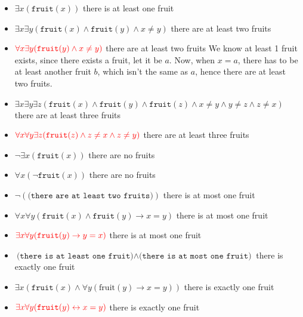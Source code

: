 \documentclass[a4paper, 12pt]{article}
\begin{document}
                \begin{itemize}
                    \itemsep0em
                    \item $\exists x (\texttt{fruit}(x))$ \hfill there is at least one fruit
                    \item $\exists x \exists y (\texttt{fruit}(x) \land \texttt{fruit}(y) \land x \neq y)$ \hfill there are at least two fruits
                    \item $\textcolor{red}{\forall x \exists y (\texttt{fruit}(y) \land x \neq y)}$ \hfill there are at least two fruits
                        \subitem We know at least 1 fruit exists, since there exists a fruit, let it be $a$. Now, when $x = a$, there has to be at least another fruit $b$, which isn't the same as $a$, hence there are at least two fruits.
                    \item $\exists x \exists y \exists z (\texttt{fruit}(x) \land \texttt{fruit}(y) \land \texttt{fruit}(z) \land x \neq y \land y \neq z \land z \neq x)$ \hfill there are at least three fruits
                    \item $\textcolor{red}{\forall x \forall y \exists z (\texttt{fruit}(z) \land z \neq x \land z \neq y)}$ \hfill there are at least three fruits
                    \item $\neg \exists x (\texttt{fruit}(x))$ \hfill there are no fruits
                    \item $\forall x (\neg \texttt{fruit}(x))$ \hfill there are no fruits
                    \item $\neg(\texttt{(there are at least two fruits)})$ \hfill there is at most one fruit
                    \item $\forall x \forall y (\texttt{fruit}(x) \land \texttt{fruit}(y) \rightarrow x = y)$ \hfill there is at most one fruit
                    \item $\textcolor{red}{\exists x \forall y (\texttt{fruit}(y) \rightarrow y = x)}$ \hfill there is at most one fruit
                    \item $\texttt{(there is at least one fruit)} \land \texttt{(there is at most one fruit)}$ \hfill there is exactly one fruit
                    \item $\exists x (\texttt{fruit}(x) \land \forall y (\text{fruit}(y) \rightarrow x = y))$ \hfill there is exactly one fruit
                    \item $\textcolor{red}{\exists x \forall y (\texttt{fruit}(y) \leftrightarrow x = y)}$ \hfill there is exactly one fruit
                \end{itemize}
\end{document}

